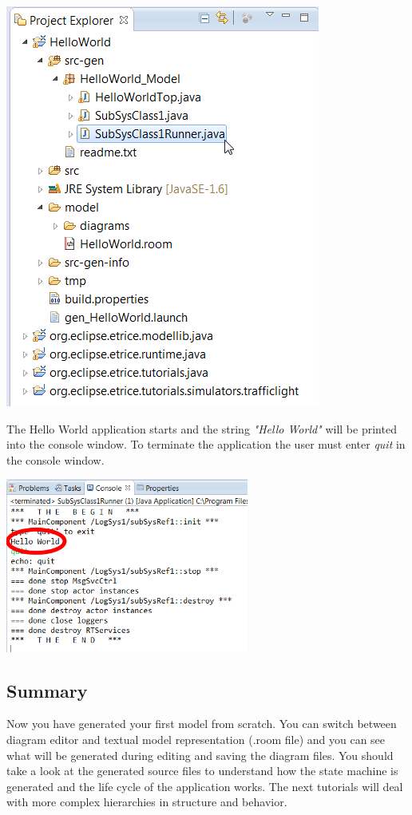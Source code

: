 \includegraphics{images/015-HelloWorld07.png}


The Hello World application starts and the string \emph{"Hello World"} will be printed into the console window. To terminate the application the user must enter \emph{quit} in the console window.

\includegraphics[width=0.6\textwidth]{images/015-HelloWorld08.png}



\subsection{Summary}

Now you have generated your first \eTrice{} model from scratch. You can switch between diagram editor and 
textual model representation (.room file) and you can see what will be generated during editing and saving the diagram files. 
You should take a look at the generated source files to understand how the state machine is generated and 
the life cycle of the application works. The next tutorials will deal with more complex hierarchies in structure and behavior.
